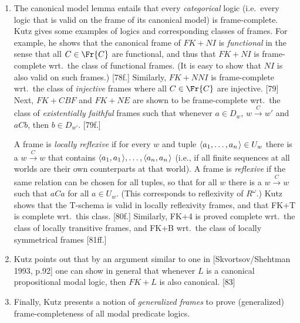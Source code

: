 \documentclass[11pt]{woarticle}
\theoremstyle{break}
\theoremstyle{nonumberplain}
\newcommand{\1}{\;\,|\;\,}
\renewcommand{\t}[1]{\ensuremath{\langle #1  \makebox[.2ex]{}\rangle}}
\begin{document}
{\begin{enumerate}
\item The canonical model lemma entails that every \emph{categorical}
  logic (i.e.\ every logic that is valid on the frame of its canonical
  model) is frame-complete. Kutz gives some examples of logics and
  corresponding classes of frames. For example, he shows that the
  canonical frame of $FK+NI$ is \emph{functional} in the sense that
  all $C \in \Fr{C}$ are functional, and thus that $FK+NI$ is
  frame-complete wrt.\ the class of functional frames. (It is easy to
  show that $NI$ is also valid on such frames.) [78f.] Similarly,
  $FK+NNI$ is frame-complete wrt.\ the class of \emph{injective}
  frames where all $C\in \Fr{C}$ are injective. [79] Next, $FK+CBF$
  and $FK+NE$ are shown to be frame-complete wrt.\ the class of
  \emph{existentially faithful} frames such that whenever $a \in D_w$,
  $w \xrightarrow{C} w'$ and $aCb$, then $b \in D_{w'}$. [79f.] 

  A frame is \emph{locally reflexive} if for every $w$ and tuple
  $\t{a_1,\ldots,a_n} \in U_w$ there is a $w \xrightarrow{C} w$ that
  contains $\t{a_1,a_1}, \ldots, \t{a_n,a_n}$ (i.e., if all finite
  sequences at all worlds are their own counterparts at that world). A
  frame is \emph{reflexive} if the same relation can be chosen for all
  tuples, so that for all $w$ there is a $w\xrightarrow{C} w$ such
  that $aCa$ for all $a\in U_w$. (This corresponds to reflexivity of
  $R^\omega$.) Kutz shows that the T-schema is valid in locally
  reflexivity frames, and that FK+T is complete wrt.\ this
  class. [80f.] Similarly, FK+4 is proved complete wrt.\ the class of
  locally transitive frames, and FK+B wrt.\ the class of locally
  symmetrical frames [81ff.]

\item Kutz points out that by an argument similar to one in
  [Skvortsov/Shehtman 1993, p.92] one can show in general that
  whenever $L$ is a canonical propositional modal logic, then $FK+L$
  is also canonical. [83]

\item Finally, Kutz presents a notion of \emph{generalized frames} to
  prove (generalized) frame-completeness of all modal predicate
  logics.

\end{enumerate}

}







\end{document}
